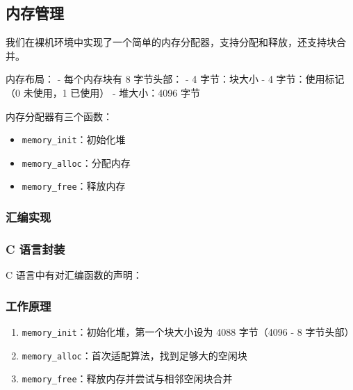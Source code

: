 
\subsection{内存管理}

我们在裸机环境中实现了一个简单的内存分配器，支持分配和释放，还支持块合并。

内存布局：
- 每个内存块有 8 字节头部：
  - 4 字节：块大小
  - 4 字节：使用标记（0 未使用，1 已使用）
- 堆大小：4096 字节

内存分配器有三个函数：
\begin{itemize}
    \item \texttt{memory\_init}：初始化堆
    \item \texttt{memory\_alloc}：分配内存
    \item \texttt{memory\_free}：释放内存
\end{itemize}

\subsubsection{汇编实现}



\subsubsection{C 语言封装}

C 语言中有对汇编函数的声明：



\subsubsection{工作原理}
\begin{enumerate}
    \item \texttt{memory\_init}：初始化堆，第一个块大小设为 4088 字节（4096 - 8 字节头部）
    \item \texttt{memory\_alloc}：首次适配算法，找到足够大的空闲块
    \item \texttt{memory\_free}：释放内存并尝试与相邻空闲块合并
\end{enumerate}
